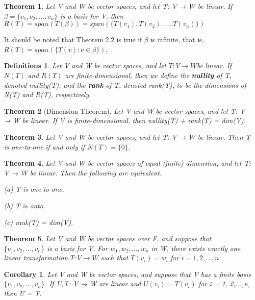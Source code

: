 \documentclass{article}
\newcommand{\bd}[1]{\textbf{#1}}
\theoremstyle{plain}
\newtheorem{theorem}{Theorem}[section]
\newtheorem*{corollary}{Corollary}
\newtheorem*{definitions}{Definitions}
\theoremstyle{plain} %
\begin{document}
\begin{theorem}
Let V and W be vector spaces, and let T: V → W be linear. If $\beta = \{v_1, v_2,\ldots,v_n\}$ is a basis for V, then $R(T) = span(T(\beta)) = span(\{T(v_1),T(v_2),\ldots,T(v_n)\})$
\end{theorem}

It should be noted that Theorem 2.2 is true if $\beta$ is infinite, that is, $R(T) = span(\{T(v): v \in \beta\})$.

\begin{definitions}
Let V and W be vector spaces, and let $T: V \to W $be linear. If $N(T)$ and $R(T)$ are finite-dimensional, then we define the \bd{nullity} of T, denoted nullity(T), and the \bd{rank} of T, denoted rank(T), to be the dimensions of N(T) and R(T), respectively.
\end{definitions}

\begin{theorem}[Dimension Theorem]
Let V and W be vector spaces, and let T: V → W be linear. If V is finite-dimensional, then nullity(T) + rank(T) = dim(V).
\end{theorem}

\begin{theorem}
Let V and W be vector spaces, and let T: V → W be linear. Then T is one-to-one if and only if $N(T) = \{0\}$.
\end{theorem}

\begin{theorem}
Let V and W be vector spaces of equal (finite) dimension, and let T: V → W be linear. Then the following are equivalent.

(a) T is one-to-one.

(b) T is onto.

(c) rank(T) = dim(V).
\end{theorem}

\begin{theorem}
Let V and W be vector spaces over F, and suppose that $\{v_1, v_2,\ldots,v_n\}$ is a basis for V. For $w_1, w_2,\ldots,w_n$ in W, there exists exactly one linear transformation $T: V \to W$ such that $T(v_i) = w_i$ for $i = 1, 2,\ldots, n$.
\end{theorem}

\begin{corollary}
Let V and W be vector spaces, and suppose that V has a finite basis $\{v_1, v_2,\ldots,v_n\}$. If U,T: V → W are linear and $U(v_i) = T(v_i)$ for i = 1, 2,...,n, then U = T.
\end{corollary}
\end{document}
